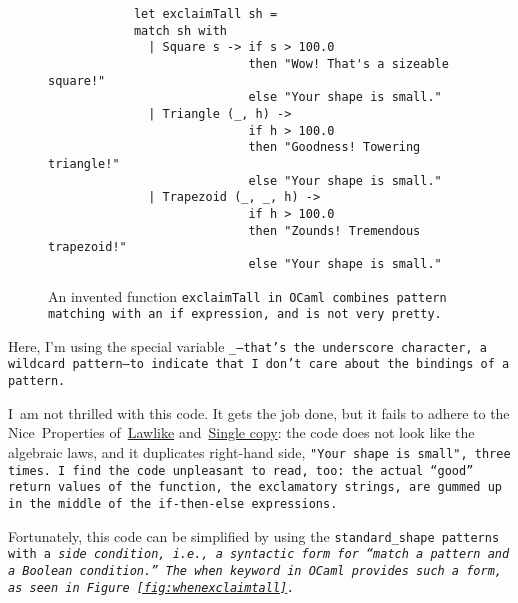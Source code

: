 \documentclass[manuscript,screen,review, 12pt, nonacm]{acmart}
\begin{document}
    \begin{figure}[ht]
        \begin{verbatim}
            let exclaimTall sh =
            match sh with 
              | Square s -> if s > 100.0 
                            then "Wow! That's a sizeable square!"
                            else "Your shape is small." 
              | Triangle (_, h) -> 
                            if h > 100.0 
                            then "Goodness! Towering triangle!"
                            else "Your shape is small." 
              | Trapezoid (_, _, h) -> 
                            if h > 100.0
                            then "Zounds! Tremendous trapezoid!"
                            else "Your shape is small." 
            \end{verbatim}    
        \caption{An invented function \tt{exclaimTall} in OCaml combines pattern
        matching with an \tt{if} expression, and is not very pretty.}   
        \label{fig:ifexclaimtall}
    \end{figure}
    
    Here, I'm using the special variable \tt{\_}---that's the underscore
    character, a wildcard pattern---to indicate that I~don't care about the
    bindings of a pattern. 

    I~am not thrilled with this code. It gets the job done, but it fails to
    adhere to the Nice~Properties of~\hyperref[p1]{Lawlike}
    and~\hyperref[p2]{Single copy}: the code does not look like the algebraic
    laws, and it duplicates right-hand side, \tt{"Your shape is small"}, three
    times. I~find the code unpleasant to read, too: the actual “good” return
    values of the function, the exclamatory strings, are gummed up in the middle
    of the \tt{if-then-else} expressions.
    
    Fortunately, this code can be simplified by using the \tt{standard\_shape} patterns
    with a \it{side condition}, i.e., a syntactic form for “match a pattern
    \it{and} a Boolean condition.” The \tt{when} keyword in OCaml provides such
    a form, as seen in Figure~\ref{fig:whenexclaimtall}.
        
\end{document}
